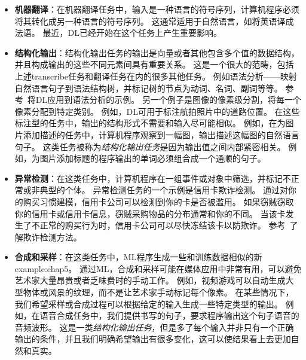\begin{itemize}
    \item \textbf{机器翻译}：在机器翻译任务中，输入是一种语言的符号序列，计算机程序必须将其转化成另一种语言的符号序列。
    这通常适用于自然语言，如将英语译成法语。
    最近，\gls{DL}已经开始在这个任务上产生重要影响\citep{Sutskever-et-al-NIPS2014,Bahdanau-et-al-ICLR2015-small}。

    \item \textbf{结构化输出}：结构化输出任务的输出是向量或者其他包含多个值的数据结构，并且构成输出的这些不同元素间具有重要关系。
    这是一个很大的范畴，包括上述\gls{transcribe}任务和翻译任务在内的很多其他任务。
    例如语法分析——映射自然语言句子到语法结构树，并标记树的节点为动词、名词、副词等等。
    参考~\cite{Collobert-AISTATS2011}将\gls{DL}应用到语法分析的示例。
    另一个例子是图像的像素级分割，将每一个像素分配到特定类别。
    例如，\gls{DL}可用于标注航拍照片中的道路位置\citep{MnihHinton2010}。
    在这些标注型的任务中，输出的结构形式不需要和输入尽可能相似。
    例如，在为图片添加描述的任务中，计算机程序观察到一幅图，输出描述这幅图的自然语言句子\citep{Kiros-et-al-ICML2014,Kiros-et-al-arxiv2014,Mao-et-al-2014,Vinyals-et-al-CVPR2015,Donahue-et-al-arxiv2014,Karpathy+Li-CVPR2015,Fang-et-al-CVPR2015,Xu-et-al-ICML2015}。
    这类任务被称为\emph{结构化输出任务}是因为输出值之间内部紧密相关。
    例如，为图片添加标题的程序输出的单词必须组合成一个通顺的句子。


    \item \textbf{异常检测}：在这类任务中，计算机程序在一组事件或对象中筛选，并标记不正常或非典型的个体。
    异常检测任务的一个示例是信用卡欺诈检测。
    通过对你的购买习惯建模，信用卡公司可以检测到你的卡是否被滥用。
    如果窃贼窃取你的信用卡或信用卡信息，窃贼采购物品的分布通常和你的不同。
    当该卡发生了不正常的购买行为时，信用卡公司可以尽快冻结该卡以防欺诈。
    参考~\cite{chandola2009anomaly}了解欺诈检测方法。

    \item \textbf{合成和采样}：在这类任务中，\gls{ML}程序生成一些和训练数据相似的新\gls{example:chap5}。
    通过\gls{ML}，合成和采样可能在媒体应用中非常有用，可以避免艺术家大量昂贵或者乏味费时的手动工作。
    例如，视频游戏可以自动生成大型物体或风景的纹理，而不是让艺术家手动标记每个像素\citep{Luo+al-AISTATS2013-small}。
    在某些情况下，我们希望采样或合成过程可以根据给定的输入生成一些特定类型的输出。
    例如，在语音合成任务中，我们提供书写的句子，要求程序输出这个句子语音的音频波形。
    这是一类\emph{结构化输出任务}，但是多了每个输入并非只有一个正确输出的条件，并且我们明确希望输出有很多变化，这可以使结果看上去更加自然和真实。


\end{itemize}
